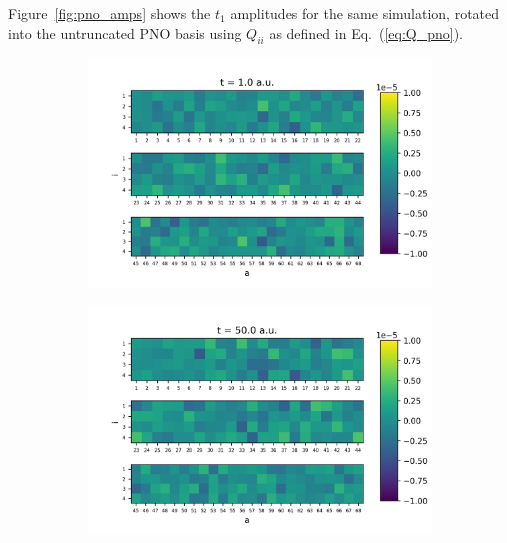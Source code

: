 Figure~\ref{fig:pno_amps} shows the $t_1$ amplitudes for the same simulation,
rotated into the untruncated PNO basis using $Q_{ii}$ as defined in
Eq.~(\ref{eq:Q_pno}).
\begin{figure}
    \begin{subfigure}{.5\textwidth}
        \centering
        \includegraphics[scale=0.5]{p3/figures/PNO_delta_t1_1.png}
        \caption{}
        \label{fig:PNO_t1_1}
    \end{subfigure}%
    \begin{subfigure}{.5\textwidth}
        \centering
        \includegraphics[scale=0.5]{p3/figures/PNO_delta_t1_50.png}
        \caption{}
        \label{fig:PNO_t1_50}
    \end{subfigure}
    \begin{subfigure}{.5\textwidth}
        \centering

\end{subfigure}
\end{figure}

